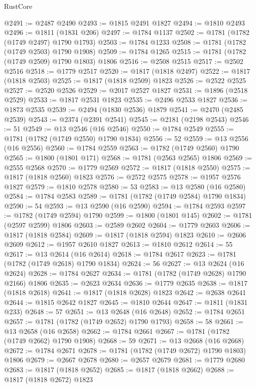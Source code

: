 \begin{lexlean}{RustCore}
\begin{coremodule}
@2491 := @2487 @2490
@2493 := @1815 @2491 @1827
@2494 := @1810 @2493
@2496 := @1811 (@1831 @206)
@2497 := @1784 @1137
@2502 := @1781 (@1782 (@1749 @2497) @1790 @1793)
@2503 := @1784 @1233
@2508 := @1781 (@1782 (@1749 @2503) @1790 @1908)
@2509 := @1784 @1265
@2515 := @1781 (@1782 (@1749 @2509) @1790 @1803) @1806
@2516 := @2508 @2515
@2517 := @2502 @2516
@2518 := @1779 @2517
@2520 := @1817 (@1818 @2497)
@2522 := @1817 (@1818 @2503)
@2525 := @1817 (@1818 @2509) @1823
@2526 := @2522 @2525
@2527 := @2520 @2526
@2529 := @2017 @2527 @1827
@2531 := @1896 (@2518 @2529)
@2533 := @1817 @2531 @1823
@2535 := @2496 @2533 @1827
@2536 := @1873 @2535
@2539 := @2494 (@1830 @2536) @1879
@2541 := @2470 (@2485 @2539)
@2543 := @2374 (@2391 @2541)
@2545 := @2181 (@2198 @2543)
@2546 := 51
@2549 := @13 @2546 (@16 @2546)
@2550 := @1784 @2549
@2555 := @1781 (@1782 (@1749 @2550) @1790 @1834)
@2556 := 52
@2559 := @13 @2556 (@16 @2556)
@2560 := @1784 @2559
@2563 := @1782 (@1749 @2560) @1790
@2565 := @1800 (@1801 @171)
@2568 := @1781 (@2563 @2565) @1806
@2569 := @2555 @2568
@2570 := @1779 @2569
@2572 := @1817 (@1818 @2550)
@2575 := @1817 (@1818 @2560) @1823
@2576 := @2572 @2575
@2578 := @1957 @2576 @1827
@2579 := @1810 @2578
@2580 := 53
@2583 := @13 @2580 (@16 @2580)
@2584 := @1784 @2583
@2589 := @1781 (@1782 (@1749 @2584) @1790 @1834)
@2590 := 54
@2593 := @13 @2590 (@16 @2590)
@2594 := @1784 @2593
@2597 := @1782 (@1749 @2594) @1790
@2599 := @1800 (@1801 @145)
@2602 := @1781 (@2597 @2599) @1806
@2603 := @2589 @2602
@2604 := @1779 @2603
@2606 := @1817 (@1818 @2584)
@2609 := @1817 (@1818 @2594) @1823
@2610 := @2606 @2609
@2612 := @1957 @2610 @1827
@2613 := @1810 @2612
@2614 := 55
@2617 := @13 @2614 (@16 @2614)
@2618 := @1784 @2617
@2623 := @1781 (@1782 (@1749 @2618) @1790 @1834)
@2624 := 56
@2627 := @13 @2624 (@16 @2624)
@2628 := @1784 @2627
@2634 := @1781 (@1782 (@1749 @2628) @1790 @2166) @1806
@2635 := @2623 @2634
@2636 := @1779 @2635
@2638 := @1817 (@1818 @2618)
@2641 := @1817 (@1818 @2628) @1823
@2642 := @2638 @2641
@2644 := @1815 @2642 @1827
@2645 := @1810 @2644
@2647 := @1811 (@1831 @233)
@2648 := 57
@2651 := @13 @2648 (@16 @2648)
@2652 := @1784 @2651
@2657 := @1781 (@1782 (@1749 @2652) @1790 @1793)
@2658 := 58
@2661 := @13 @2658 (@16 @2658)
@2662 := @1784 @2661
@2667 := @1781 (@1782 (@1749 @2662) @1790 @1908)
@2668 := 59
@2671 := @13 @2668 (@16 @2668)
@2672 := @1784 @2671
@2678 := @1781 (@1782 (@1749 @2672) @1790 @1803) @1806
@2679 := @2667 @2678
@2680 := @2657 @2679
@2681 := @1779 @2680
@2683 := @1817 (@1818 @2652)
@2685 := @1817 (@1818 @2662)
@2688 := @1817 (@1818 @2672) @1823

\end{coremodule}
\end{lexlean}
